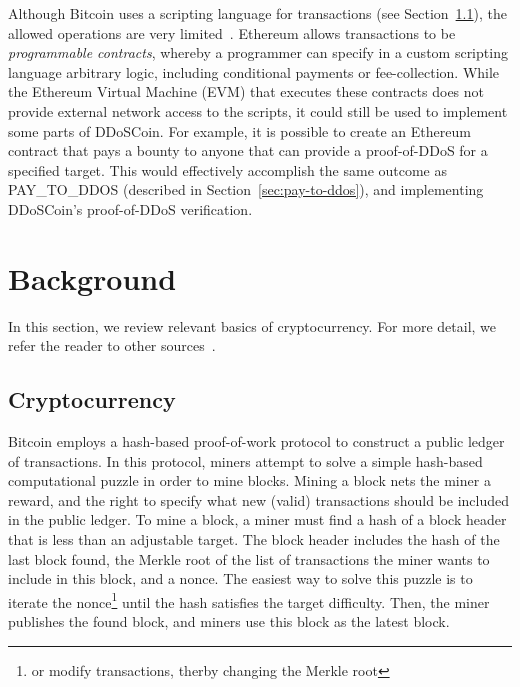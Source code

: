 Although Bitcoin uses a scripting language for transactions (see
Section~\ref{sec:scripting}), the allowed operations are very
limited~\cite{bitcoin-paper}. Ethereum allows transactions to be
\emph{programmable contracts}, whereby a programmer can specify in a custom
scripting language arbitrary logic, including conditional payments or
fee-collection. While the Ethereum Virtual Machine (EVM) that executes these
contracts does not provide external network access to the scripts, it could
still be used to implement some parts of DDoSCoin. For example, it is possible
to create an Ethereum contract that pays a bounty to anyone that can provide a
proof-of-DDoS for a specified target. This would effectively accomplish the same
outcome as PAY\_TO\_DDOS (described in Section~\ref{sec:pay-to-ddos}), and
implementing DDoSCoin's proof-of-DDoS verification.


\section{Background}

In this section, we review relevant basics of cryptocurrency. For more
detail, we refer the reader to other
sources~\cite{bitcoin-book,bitcoin-paper,bitcoin-sok}.

\subsection{Cryptocurrency}
\label{sec:scripting}
\FigTx

Bitcoin employs a hash-based proof-of-work protocol to construct a public ledger
of transactions. In this protocol, miners attempt to solve a simple hash-based
computational puzzle in order to mine blocks. Mining a block nets the miner a
reward, and the right to specify what new (valid) transactions should be
included in the public ledger. To mine a block, a miner must find a hash of a
block header that is less than an adjustable target. The block header includes
the hash of the last block found, the Merkle root of the list of transactions
the miner wants to include in this block, and a nonce. The easiest way to solve
this puzzle is to iterate the nonce\footnote{or modify transactions, therby
changing the Merkle root} until the hash satisfies the target difficulty. Then,
the miner publishes the found block, and miners use this block as the latest
block.

